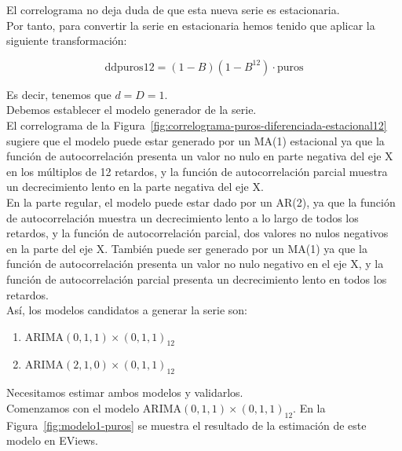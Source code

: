 \documentclass[12pt,a4paper,twoside,openright,titlepage,final]{article}
\begin{document}
El correlograma no deja duda de que esta nueva serie es estacionaria.\\

Por tanto, para convertir la serie en estacionaria hemos tenido que aplicar la siguiente transformación:

\[ \text{ddpuros12} = (1-B)(1-B^{12}) \cdot \text{puros} \]

Es decir, tenemos que $d=D=1$.\\

Debemos establecer el modelo generador de la serie.\\

El correlograma de la Figura~\ref{fig:correlograma-puros-diferenciada-estacional12} sugiere que el modelo puede estar generado por un MA(1) estacional ya que la función de autocorrelación presenta un valor no nulo en parte negativa del eje X en los múltiplos de 12 retardos, y la función de autocorrelación parcial muestra un decrecimiento lento en la parte negativa del eje X.\\

En la parte regular, el modelo puede estar dado por un AR(2), ya que la función de autocorrelación muestra un decrecimiento lento a lo largo de todos los retardos, y la función de autocorrelación parcial, dos valores no nulos negativos en la parte del eje X. También puede ser generado por un MA(1) ya que la función de autocorrelación presenta un valor no nulo negativo en el eje X, y la función de autocorrelación parcial presenta un decrecimiento lento en todos los retardos.\\

Así, los modelos candidatos a generar la serie son:

\begin{enumerate}
	\item ARIMA$(0,1,1)\times(0,1,1)_{12}$
	\item ARIMA$(2,1,0)\times(0,1,1)_{12}$
\end{enumerate}

Necesitamos estimar ambos modelos y validarlos.\\

Comenzamos con el modelo ARIMA$(0,1,1)\times(0,1,1)_{12}$. En la Figura~\ref{fig:modelo1-puros} se muestra el resultado de la estimación de este modelo en EViews.\\
\end{document}

